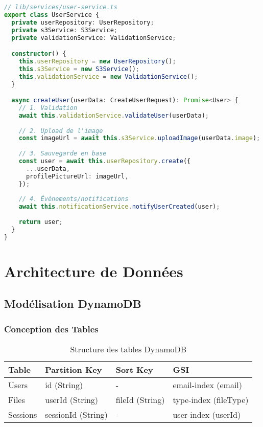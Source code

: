 \begin{lstlisting}[language=TypeScript, caption=Architecture de service]
// lib/services/user-service.ts
export class UserService {
  private userRepository: UserRepository;
  private s3Service: S3Service;
  private validationService: ValidationService;

  constructor() {
    this.userRepository = new UserRepository();
    this.s3Service = new S3Service();
    this.validationService = new ValidationService();
  }

  async createUser(userData: CreateUserRequest): Promise<User> {
    // 1. Validation
    await this.validationService.validateUser(userData);
    
    // 2. Upload de l'image
    const imageUrl = await this.s3Service.uploadImage(userData.image);
    
    // 3. Sauvegarde en base
    const user = await this.userRepository.create({
      ...userData,
      profilePictureUrl: imageUrl,
    });
    
    // 4. Événements/notifications
    await this.notificationService.notifyUserCreated(user);
    
    return user;
  }
}
\end{lstlisting}

\section{Architecture de Données}

\subsection{Modélisation DynamoDB}

\subsubsection{Conception des Tables}

\begin{table}[H]
    \centering
    \begin{tabularx}{\textwidth}{|l|X|X|X|}
        \hline
        \textbf{Table} & \textbf{Partition Key} & \textbf{Sort Key} & \textbf{GSI} \\
        \hline
        Users & id (String) & - & email-index (email) \\
        \hline
        Files & userId (String) & fileId (String) & type-index (fileType) \\
        \hline
        Sessions & sessionId (String) & - & user-index (userId) \\
        \hline
    \end{tabularx}
    \caption{Structure des tables DynamoDB}
    \label{tab:dynamodb_tables}
\end{table}

